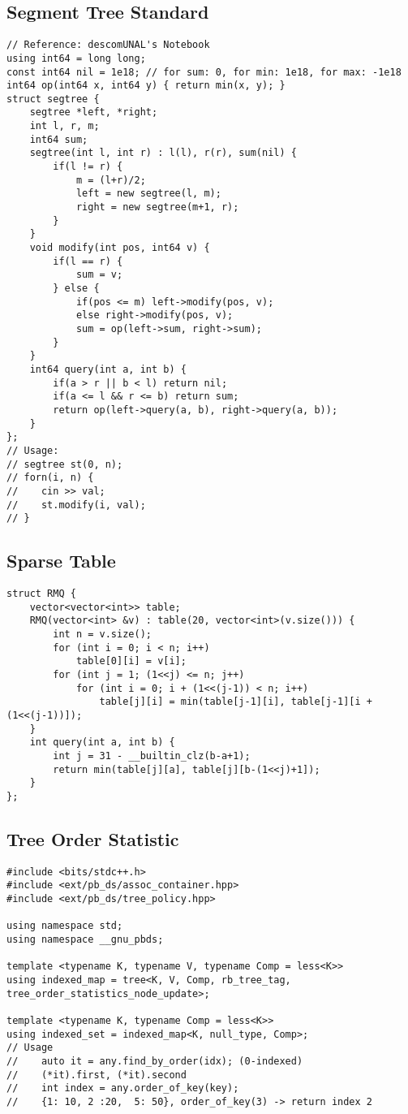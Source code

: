 \documentclass[10pt,letterpaper,twocolumn,twosided]{article}
\begin{document}
\subsection{Segment Tree Standard}
\begin{lstlisting}
// Reference: descomUNAL's Notebook
using int64 = long long;
const int64 nil = 1e18; // for sum: 0, for min: 1e18, for max: -1e18
int64 op(int64 x, int64 y) { return min(x, y); }
struct segtree {
    segtree *left, *right;
    int l, r, m;
    int64 sum;
    segtree(int l, int r) : l(l), r(r), sum(nil) {
        if(l != r) {
            m = (l+r)/2;
            left = new segtree(l, m);
            right = new segtree(m+1, r);
        }
    }
    void modify(int pos, int64 v) {
        if(l == r) {
            sum = v;
        } else {
            if(pos <= m) left->modify(pos, v);
            else right->modify(pos, v);
            sum = op(left->sum, right->sum);
        }
    }
    int64 query(int a, int b) {
        if(a > r || b < l) return nil;
        if(a <= l && r <= b) return sum;
        return op(left->query(a, b), right->query(a, b));
    }
};
// Usage:
// segtree st(0, n);
// forn(i, n) {
//    cin >> val;
//    st.modify(i, val);
// }
\end{lstlisting}

\subsection{Sparse Table}
\begin{lstlisting}
struct RMQ {
    vector<vector<int>> table;
    RMQ(vector<int> &v) : table(20, vector<int>(v.size())) {
        int n = v.size();
        for (int i = 0; i < n; i++)
            table[0][i] = v[i];
        for (int j = 1; (1<<j) <= n; j++)
            for (int i = 0; i + (1<<(j-1)) < n; i++)
                table[j][i] = min(table[j-1][i], table[j-1][i + (1<<(j-1))]);
    }
    int query(int a, int b) {
        int j = 31 - __builtin_clz(b-a+1);
        return min(table[j][a], table[j][b-(1<<j)+1]);
    }
};
\end{lstlisting}

\subsection{Tree Order Statistic}
\begin{lstlisting}
#include <bits/stdc++.h>
#include <ext/pb_ds/assoc_container.hpp> 
#include <ext/pb_ds/tree_policy.hpp>

using namespace std;
using namespace __gnu_pbds;

template <typename K, typename V, typename Comp = less<K>>
using indexed_map = tree<K, V, Comp, rb_tree_tag, tree_order_statistics_node_update>;

template <typename K, typename Comp = less<K>>
using indexed_set = indexed_map<K, null_type, Comp>;
// Usage
//    auto it = any.find_by_order(idx); (0-indexed)
//    (*it).first, (*it).second
//    int index = any.order_of_key(key);
//    {1: 10, 2 :20,  5: 50}, order_of_key(3) -> return index 2
\end{lstlisting}
\end{document}
